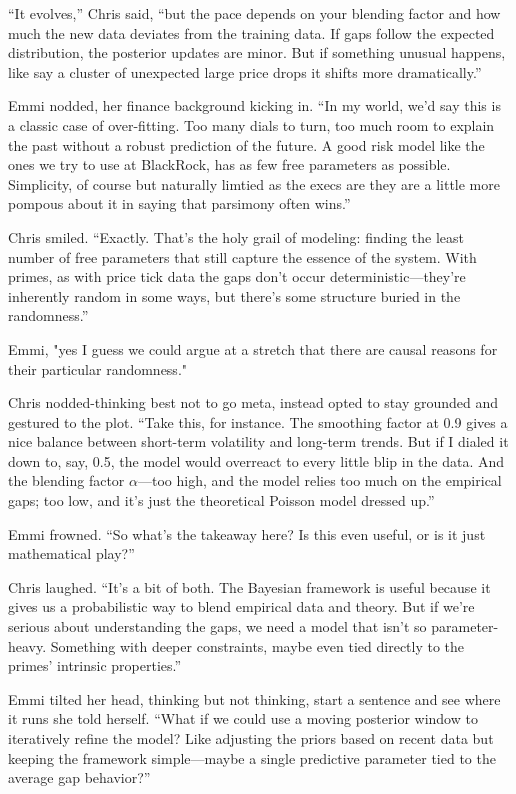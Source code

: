 “It evolves,” Chris said, “but the pace depends on your blending factor and how much the new data deviates from the training data. If gaps follow the expected distribution, the posterior updates are minor. But if something unusual happens, like say a cluster of unexpected large price drops it shifts more dramatically.”

Emmi nodded, her finance background kicking in. “In my world, we’d say this is a classic case of over-fitting. Too many dials to turn, too much room to explain the past without a robust prediction of the future. A good risk model like the ones we try to use at BlackRock, has as few free parameters as possible. Simplicity, of course but naturally limtied as the execs are they are a little more pompous about it in saying that parsimony often wins.”

Chris smiled. “Exactly. That’s the holy grail of modeling: finding the least number of free parameters that still capture the essence of the system. With primes, as with price tick data the gaps don't occur deterministic—they’re inherently random in some ways, but there’s some structure buried in the randomness.”

Emmi, "yes I guess we could argue at a stretch that there are causal reasons for their particular randomness."

Chris nodded-thinking best not to go meta, instead opted to stay grounded and gestured to the plot. “Take this, for instance. The smoothing factor at 0.9 gives a nice balance between short-term volatility and long-term trends. But if I dialed it down to, say, 0.5, the model would overreact to every little blip in the data. And the blending factor \(\alpha\)—too high, and the model relies too much on the empirical gaps; too low, and it’s just the theoretical Poisson model dressed up.”

Emmi frowned. “So what’s the takeaway here? Is this even useful, or is it just mathematical play?”

Chris laughed. “It’s a bit of both. The Bayesian framework is useful because it gives us a probabilistic way to blend empirical data and theory. But if we’re serious about understanding the gaps, we need a model that isn’t so parameter-heavy. Something with deeper constraints, maybe even tied directly to the primes’ intrinsic properties.”

Emmi tilted her head, thinking but not thinking, start a sentence and see where it runs she told herself. “What if we could use a moving posterior window to iteratively refine the model? Like adjusting the priors based on recent data but keeping the framework simple—maybe a single predictive parameter tied to the average gap behavior?”


